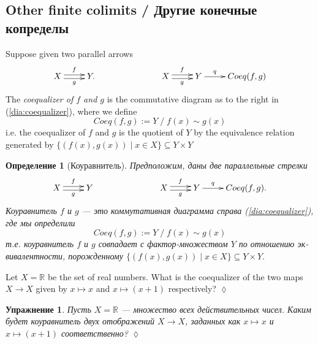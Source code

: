 \documentclass[a4paper]{book}
\def\RR{{\mathbb R}}
\def\to{\rightarrow}
\def\ss{\subseteq}
\def\|{{\;|\;}}
\theoremstyle{myth}
\newtheorem{excENG}[envENG]{\begin{english}Exercise\end{english}}
\newtheorem{definitionENG}[envENG]{\begin{english}Definition\end{english}}
\newenvironment{exerciseENG}{\begin{excENG}}{\hspace*{\fill}$\lozenge$\end{excENG}}
\newtheorem{excRUS}[envRUS]{Упражнение}
\newtheorem{definitionRUS}[envRUS]{Определение}
\newenvironment{exerciseRUS}{\begin{excRUS}}{\hspace*{\fill}$\lozenge$\end{excRUS}}
\begin{document}
\begin{russian}

\subsection{Other finite colimits / Другие конечные копределы}

\begin{definitionENG}[Coequalizer]\label{def:coequalizer}
Suppose given two parallel arrows 
\begin{align}\label{dia:coequalizer}
\xymatrix{X\ar@<.5ex>[r]^f\ar@<-.5ex>[r]_g&Y.}\hspace{1in}\xymatrix{X\ar@<.5ex>[r]^f\ar@<-.5ex>[r]_g&Y\ar[r]^-q&Coeq(f,g)}
\end{align}
The {\em coequalizer of $f$ and $g$} is the commutative diagram as to the right in (\ref{dia:coequalizer}), where we define $$Coeq(f,g):=Y\;/\;f(x)\sim g(x)$$ i.e. the coequalizer of $f$ and $g$ is the quotient of $Y$ by the equivalence relation generated by $\{(f(x),g(x))\|x\in X\}\ss Y\times Y$
\end{definitionENG}

\begin{definitionRUS}[Коуравнитель]\label{def:coequalizer}
Предположим, даны две параллельные стрелки 
\begin{align}\label{dia:coequalizer}
\xymatrix{X\ar@<.5ex>[r]^f\ar@<-.5ex>[r]_g&Y}\hspace{1in}\xymatrix{X\ar@<.5ex>[r]^f\ar@<-.5ex>[r]_g&Y\ar[r]^-q&Coeq(f,g).}
\end{align}
{\em Коуравнитель $f$ и $g$} — это коммутативная диаграмма справа (\ref{dia:coequalizer}), где мы определили $$Coeq(f,g):=Y\;/\;f(x)\sim g(x)$$ т.е. коуравнитель $f$ и $g$ совпадает с фактор-множеством $Y$ по отношению эквивалентности, порожденному $\{(f(x),g(x))\|x\in X\}\ss Y\times Y.$
\end{definitionRUS}

\begin{exerciseENG}
Let $X=\RR$ be the set of real numbers. What is the coequalizer of the two maps $X\to X$ given by $x\mapsto x$ and $x\mapsto (x+1)$ respectively?
\end{exerciseENG}

\begin{exerciseRUS}
Пусть $X=\RR$ — множество всех действительных чисел. Каким будет коуравнитель двух отображений $X\to X$, заданных как $x\mapsto x$ и $x\mapsto (x+1)$ соответственно?
\end{exerciseRUS}


\end{russian}
\end{document}
